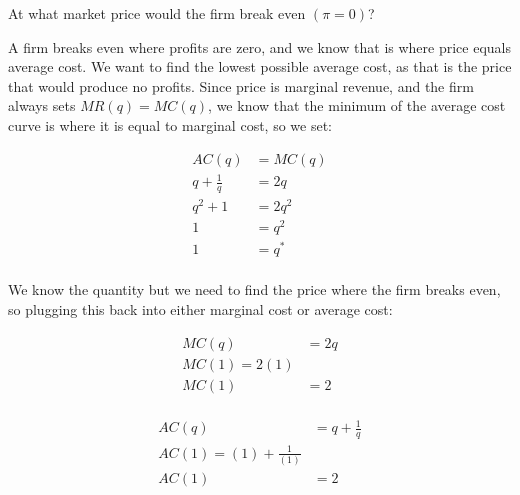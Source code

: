 \documentclass[12 pt]{exam}
\begin{document}
\begin{questions}
\clearpage

\question At what market price would the firm break even $(\pi=0)$?

\begin{solution}

A firm breaks even where profits are zero, and we know that is where price equals average cost. We want to find the lowest possible average cost, as that is the price that would produce no profits. Since price is marginal revenue, and the firm always sets $MR(q)=MC(q)$, we know that the minimum of the average cost curve is where it is equal to marginal cost, so we set: 

$$\begin{aligned}
	AC(q)&=MC(q)\\
	q+\frac{1}{q}&=2q	\\
	q^2+1&=2q^2	\\
	1&=q^2	\\
	1&=q^* \\
\end{aligned}$$

We know the quantity but we need to find the price where the firm breaks even, so plugging this back into either marginal cost or average cost: 

$$\begin{aligned}
	MC(q)&=2q\\
	MC(1)=2(1)\\
	MC(1)&=2\\
\end{aligned}$$

$$\begin{aligned}
	AC(q)&=q+\frac{1}{q}\\
	AC(1)=(1)+\frac{1}{(1)}\\
	AC(1)&=2\\
\end{aligned}$$


\end{solution}
\end{questions}
\end{document}
